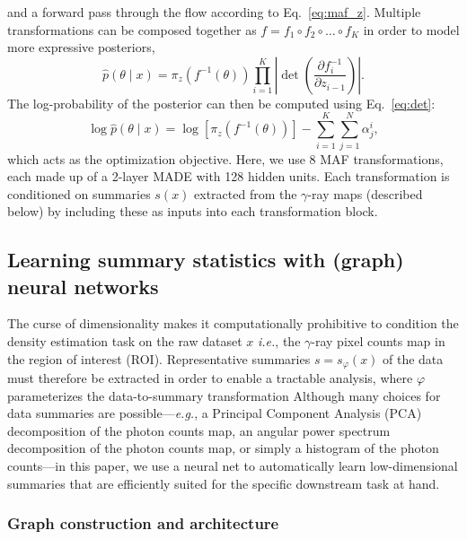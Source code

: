 \documentclass[prd,aps,10pt,nofootinbib,twocolumn,superscriptaddress,preprintnumbers,balancelastpage,longbibliography]{revtex4-1}
\begin{document}
and a forward pass through the flow according to Eq.~\eqref{eq:maf_z}.
Multiple transformations can be composed together as $f=f_{1} \circ f_{2} \circ \ldots \circ f_{K}$ in order to model more expressive posteriors,
\begin{equation}
    \hat{p}({\theta} \mid {x})=\pi_{z}\left(f^{-1}({\theta})\right) \prod_{i=1}^{K}\left|\operatorname{det}\left(\frac{\partial f_{i}^{-1}}{\partial {z}_{i-1}}\right)\right|.
\end{equation}
The log-probability of the posterior can then be computed using Eq.~\eqref{eq:det}:
\begin{equation}
    \log \hat{p}({\theta} \mid {x}) = \log \left[\pi_{z}\left(f^{-1}({\theta})\right)\right]-\sum_{i=1}^{K} \sum_{j=1}^{N} \alpha_{j}^{i},
\end{equation}
which acts as the optimization objective. Here, we use 8 MAF transformations, each made up of a 2-layer MADE with 128 hidden units. Each transformation is conditioned on summaries $s(x)$ extracted from the $\gamma$-ray maps (described below) by including these as inputs into each transformation block. %

\subsection{Learning summary statistics with (graph) neural networks}

The curse of dimensionality makes it computationally prohibitive to condition the density estimation task on the raw dataset $x$ \emph{i.e.}, the $\gamma$-ray pixel counts map in the region of interest (ROI). Representative summaries $s = s_\varphi(x)$ of the data must therefore be extracted in order to enable a tractable analysis, where $\varphi$ parameterizes the data-to-summary transformation Although many choices for data summaries are possible---\emph{e.g.}, a Principal Component Analysis (PCA) decomposition of the photon counts map, an angular power spectrum decomposition of the photon counts map, or simply a histogram of the photon counts---in this paper, we use a neural net to automatically learn low-dimensional summaries that are efficiently suited for the specific downstream task at hand.

\subsubsection*{Graph construction and architecture}
\end{document}
